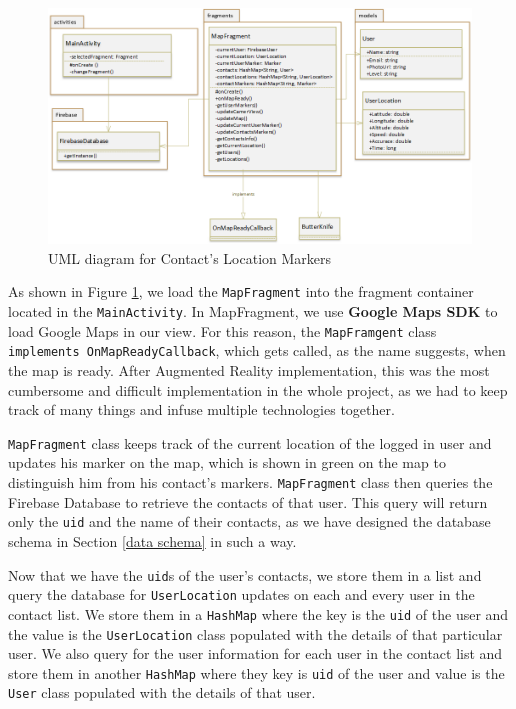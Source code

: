 \begin{figure}
    \centering
        \includegraphics[width=1.00\textwidth]{images/uml-map.png}
    \caption{UML diagram for Contact's Location Markers}
    \label{fig:uml-map}
\end{figure}

As shown in Figure \ref{fig:uml-map}, we load the \texttt{MapFragment} into the fragment container located in the \texttt{MainActivity}. In MapFragment, we use \textbf{Google Maps SDK} to load Google Maps in our view. For this reason, the \texttt{MapFramgent} class \texttt{implements OnMapReadyCallback}, which gets called, as the name suggests, when the map is ready. After Augmented Reality implementation, this was the most cumbersome and difficult implementation in the whole project, as we had to keep track of many things and infuse multiple technologies together.

\texttt{MapFragment} class keeps track of the current location of the logged in user and updates his marker on the map, which is shown in green on the map to distinguish him from his contact's markers. \texttt{MapFragment} class then queries the Firebase Database to retrieve the contacts of that user. This query will return only the \texttt{uid} and the name of their contacts, as we have designed the database schema in Section \ref{data schema} in such a way.  

Now that we have the \texttt{uid}s of the user's contacts, we store them in a list and query the database for \texttt{UserLocation} updates on each and every user in the contact list. We store them in a \texttt{HashMap} where the key is the \texttt{uid} of the user and the value is the \texttt{UserLocation} class populated with the details of that particular user. We also query for the user information for each user in the contact list and store them in another \texttt{HashMap} where they key is \texttt{uid} of the user and value is the \texttt{User} class populated with the details of that user.

